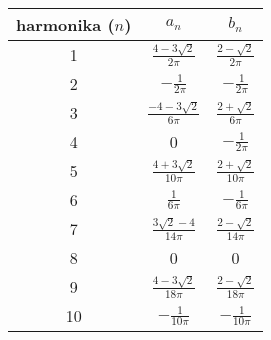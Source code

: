  \begin{center}
  \begin{tabular}{ c | c | c  }
    harmonika ($n$) & $a_n$ & $b_n$\\
  \hline
  1 & 
    $\frac{4 - 3 \sqrt{2}}{2 \pi}$ &
    $\frac{2 - \sqrt{2}}{2 \pi} $ \\
  2 & 
    $-\frac{1}{2\pi}$ &
    $-\frac{1}{2\pi}$ \\
  3 & 
    $\frac{-4 - 3 \sqrt{2}}{6 \pi}$ &
    $\frac{2 + \sqrt{2}}{6 \pi}$ \\
  4 &
    0 &
    $-\frac{1}{2 \pi}$ \\
  5 &
    $\frac{4 + 3 \sqrt{2}}{10 \pi}$ &
    $\frac{2 + \sqrt{2}}{10 \pi}$ \\
  6 &
    $\frac{1}{6 \pi}$ &
    $-\frac{1}{6 \pi}$ \\
  7 &
    $\frac{3 \sqrt{2} - 4}{14 \pi}$ &
    $ \frac{2 - \sqrt{2}}{14 \pi} $ \\
  8 & 0 & 0\\
  9 &
    $\frac{4 - 3 \sqrt{2}}{18 \pi}$ &
    $\frac{2 - \sqrt{2}}{18 \pi} $ \\
  10&
    $ -\frac{1}{10 \pi}$ &
    $ -\frac{1}{10 \pi }$ \\
  \end{tabular}
\end{center}

